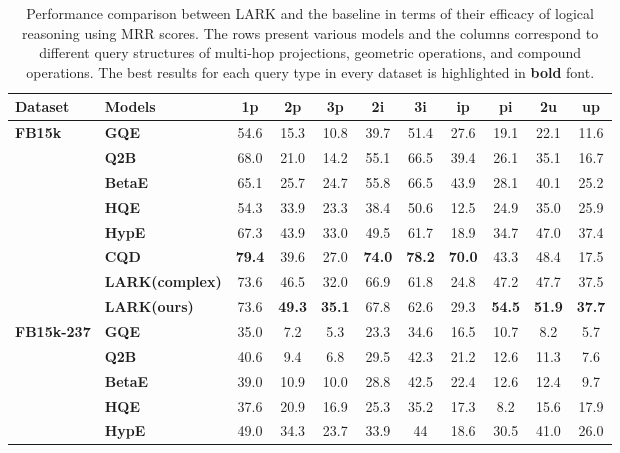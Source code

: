 \documentclass{article} %
\newcommand{\model}{LARK}
\begin{document}
\begin{table}[htbp]
\centering
\small
\vspace{-1em}
\caption{Performance comparison between {\model} and the baseline in terms of their efficacy of logical reasoning using MRR scores. The rows present various models and the columns correspond to different query structures of multi-hop projections, geometric operations, and compound operations. The best results for each query type in every dataset is highlighted in \textbf{bold} font.}
\begin{tabular}{l|l|ccccccccc}
\hline
\textbf{Dataset} & \textbf{Models}   & \textbf{1p}   & \textbf{2p}   & \textbf{3p}   & \textbf{2i}   & \textbf{3i}   & \textbf{ip}   & \textbf{pi}   & \textbf{2u}   & \textbf{up}   \\
\hline
\textbf{FB15k} &\textbf{GQE}         & 54.6 & 15.3 & 10.8 & 39.7 & 51.4 & 27.6 & 19.1 & 22.1 & 11.6 \\
&\textbf{Q2B}         & 68.0   & 21.0   & 14.2 & 55.1 & 66.5 & 39.4 & 26.1 & 35.1 & 16.7 \\
&\textbf{BetaE}             & 65.1 & 25.7 & 24.7 & 55.8 & 66.5 & 43.9 & 28.1 & 40.1 & 25.2 \\
&\textbf{HQE}               & 54.3 & 33.9 & 23.3 & 38.4 & 50.6 & 12.5 & 24.9 & 35.0   & 25.9 \\
&\textbf{HypE}              & 67.3 & 43.9 & 33.0   & 49.5 & 61.7 & 18.9 & 34.7 & 47.0   & 37.4 \\
&\textbf{CQD}               & \textbf{79.4} & 39.6 & 27.0   & \textbf{74.0}   & \textbf{78.2} & \textbf{70.0}   & 43.3 & 48.4 & 17.5 \\
&\textbf{{\model}(complex)} & 73.6&46.5&32.0&66.9&61.8&24.8&47.2&47.7&37.5     \\
&\textbf{{\model}(ours)} & 73.6&\textbf{49.3}&\textbf{35.1}&67.8&62.6&29.3&\textbf{54.5}&\textbf{51.9}&\textbf{37.7}\\
\hline
\textbf{FB15k-237} &\textbf{GQE}     & 35.0   & 7.2  & 5.3  & 23.3 & 34.6 & 16.5 & 10.7 & 8.2  & 5.7  \\
&\textbf{Q2B}         & 40.6 & 9.4  & 6.8  & 29.5 & 42.3 & 21.2 & 12.6 & 11.3 & 7.6  \\
&\textbf{BetaE}             & 39.0   & 10.9 & 10.0   & 28.8 & 42.5 & 22.4 & 12.6 & 12.4 & 9.7  \\
&\textbf{HQE}               & 37.6 & 20.9 & 16.9 & 25.3 & 35.2 & 17.3 & 8.2  & 15.6 & 17.9 \\
&\textbf{HypE}              & 49.0   & 34.3 & 23.7 & 33.9 & 44   & 18.6 & 30.5 & 41.0   & 26.0   \\

\end{tabular}
\end{table}
\end{document}
